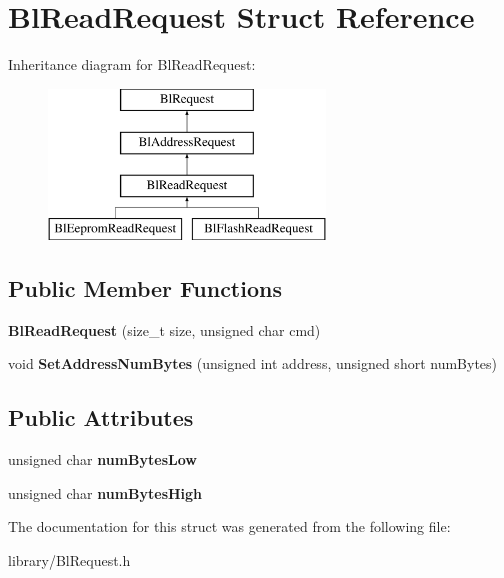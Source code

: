 \hypertarget{struct_bl_read_request}{\section{Bl\-Read\-Request Struct Reference}
\label{struct_bl_read_request}
}
Inheritance diagram for Bl\-Read\-Request\-:\begin{figure}[H]
\begin{center}
\leavevmode
\includegraphics[height=4.000000cm]{struct_bl_read_request}
\end{center}
\end{figure}
\subsection*{Public Member Functions}
\begin{DoxyCompactItemize}
\item 
\hypertarget{struct_bl_read_request_a5e2c76a2fadad900193acedfc0f24f77}{{\bfseries Bl\-Read\-Request} (size\-\_\-t size, unsigned char cmd)}\label{struct_bl_read_request_a5e2c76a2fadad900193acedfc0f24f77}

\item 
\hypertarget{struct_bl_read_request_ad5aba1ab1c446945f62f05b21d3fac4d}{void {\bfseries Set\-Address\-Num\-Bytes} (unsigned int address, unsigned short num\-Bytes)}\label{struct_bl_read_request_ad5aba1ab1c446945f62f05b21d3fac4d}

\end{DoxyCompactItemize}
\subsection*{Public Attributes}
\begin{DoxyCompactItemize}
\item 
\hypertarget{struct_bl_read_request_a9b116d5f7400f16a396a06e15ffe7be8}{unsigned char {\bfseries num\-Bytes\-Low}}\label{struct_bl_read_request_a9b116d5f7400f16a396a06e15ffe7be8}

\item 
\hypertarget{struct_bl_read_request_a44457a87186ed4e9771c14f6751623f8}{unsigned char {\bfseries num\-Bytes\-High}}\label{struct_bl_read_request_a44457a87186ed4e9771c14f6751623f8}

\end{DoxyCompactItemize}


The documentation for this struct was generated from the following file\-:\begin{DoxyCompactItemize}
\item 
library/Bl\-Request.\-h\end{DoxyCompactItemize}
